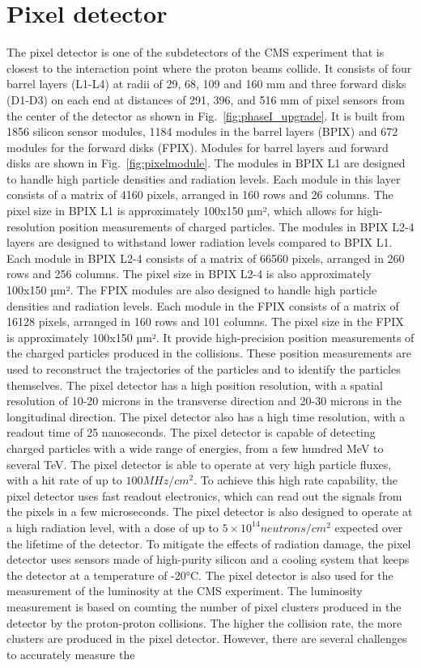 \section{Pixel detector}

The pixel detector is one of the subdetectors of the CMS experiment that is closest to the interaction point where the proton beams collide. It consists of four barrel layers (L1-L4) at radii of 29, 68, 109 and 160 mm and three forward disks (D1-D3) on each end at distances of 291, 396, and 516 mm of pixel sensors from the center of the detector as shown in Fig.~\ref{fig:phaseI_upgrade}. It is built from 1856 silicon sensor modules, 1184 modules in the barrel layers (BPIX) and 672 modules for the forward disks (FPIX). Modules for barrel layers and forward disks are shown in Fig.~\ref{fig:pixelmodule}.  The modules in BPIX L1 are designed to handle high particle densities and radiation levels. Each module in this layer consists of a matrix of 4160 pixels, arranged in 160 rows and 26 columns. The pixel size in BPIX L1 is approximately 100x150 µm², which allows for high-resolution position measurements of charged particles. The modules in BPIX L2-4 layers are designed to withstand lower radiation levels compared to BPIX L1. Each module in BPIX L2-4 consists of a matrix of 66560 pixels, arranged in 260 rows and 256 columns. The pixel size in BPIX L2-4 is also approximately 100x150 µm². The FPIX modules are also designed to handle high particle densities and radiation levels. Each module in the FPIX consists of a matrix of 16128 pixels, arranged in 160 rows and 101 columns. The pixel size in the FPIX is approximately 100x150 µm². It provide high-precision position measurements of the charged particles produced in the collisions. These position measurements are used to reconstruct the trajectories of the particles and to identify the particles themselves. The pixel detector has a high position resolution, with a spatial resolution of 10-20 microns in the transverse direction and 20-30 microns in the longitudinal direction. The pixel detector also has a high time resolution, with a readout time of 25 nanoseconds. The pixel detector is capable of detecting charged particles with a wide range of energies, from a few hundred MeV to several TeV. The pixel detector is able to operate at very high particle fluxes, with a hit rate of up to $100 MHz/cm^2$. To achieve this high rate capability, the pixel detector uses fast readout electronics, which can read out the signals from the pixels in a few microseconds. The pixel detector is also designed to operate at a high radiation level, with a dose of up to $5 \times 10^{14} neutrons/cm^2$ expected over the lifetime of the detector. To mitigate the effects of radiation damage, the pixel detector uses sensors made of high-purity silicon and a cooling system that keeps the detector at a temperature of -20°C. The pixel detector is also used for the measurement of the luminosity at the CMS experiment. The luminosity measurement is based on counting the number of pixel clusters produced in the detector by the proton-proton collisions. The higher the collision rate, the more clusters are produced in the pixel detector. However, there are several challenges to accurately measure the 